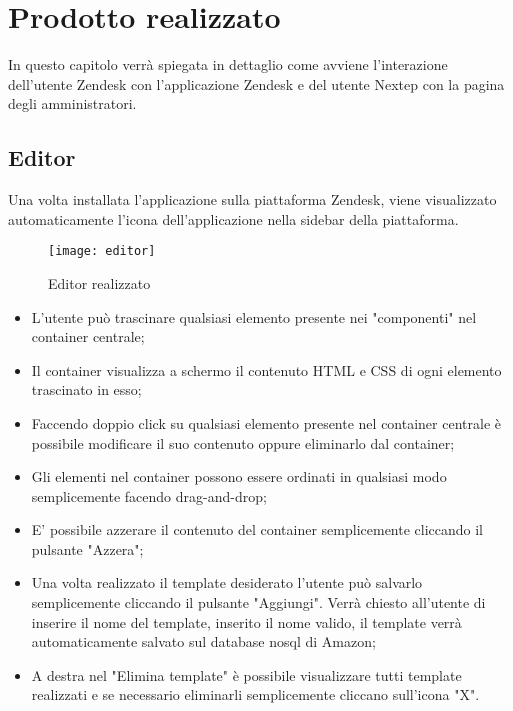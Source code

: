 
\chapter{Prodotto realizzato}
\label{cap:verifica-validazione}
In questo capitolo verrà spiegata in dettaglio come avviene l’interazione dell'utente Zendesk con l'applicazione
Zendesk e del utente Nextep con la pagina degli amministratori.

\section{Editor}
Una volta installata l'applicazione sulla piattaforma Zendesk, viene visualizzato automaticamente l'icona dell'applicazione nella sidebar della piattaforma. 
\begin{figure}[!h] 
	\centering 
	\texttt{[image: editor]} 
	\caption{Editor realizzato }
\end{figure}
\begin{itemize}
	\item L'utente può trascinare qualsiasi elemento presente nei "componenti" nel container centrale;
	\item Il container visualizza a schermo il contenuto  HTML e CSS di ogni elemento trascinato in esso;
	\item Faccendo doppio click su qualsiasi elemento presente nel container centrale è possibile modificare il suo contenuto oppure eliminarlo dal container;
	\item Gli elementi nel container possono essere ordinati in qualsiasi modo semplicemente facendo drag-and-drop;
	\item E' possibile azzerare il contenuto del container semplicemente cliccando il pulsante "Azzera";
	\item Una volta realizzato il template desiderato l'utente può salvarlo semplicemente cliccando il pulsante "Aggiungi". Verrà chiesto all'utente di inserire il nome del template, inserito il nome valido, il template verrà automaticamente salvato sul database nosql di Amazon;
	\item A destra nel "Elimina template" è possibile visualizzare tutti template realizzati e se necessario eliminarli semplicemente cliccano sull'icona "X".  
\end{itemize}
